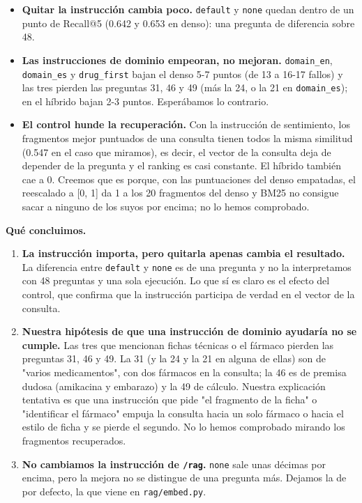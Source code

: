 \begin{itemize}
\tightlist
\item
  \textbf{Quitar la instrucción cambia poco.} \texttt{default} y \texttt{none} quedan dentro de un punto de Recall@5
  (0.642 y 0.653 en denso): una pregunta de diferencia sobre 48.
\item
  \textbf{Las instrucciones de dominio empeoran, no mejoran.} \texttt{domain\_\allowbreak{}en}, \texttt{domain\_\allowbreak{}es} y \texttt{drug\_\allowbreak{}first}
  bajan el denso 5-7 puntos (de 13 a 16-17 fallos) y las tres pierden las preguntas 31, 46 y 49
  (más la 24, o la 21 en \texttt{domain\_\allowbreak{}es}); en el híbrido bajan 2-3 puntos. Esperábamos lo contrario.
\item
  \textbf{El control hunde la recuperación.} Con la instrucción de sentimiento, los fragmentos mejor
  puntuados de una consulta tienen todos la misma similitud (0.547 en el caso que miramos), es
  decir, el vector de la consulta deja de depender de la pregunta y el ranking es casi constante.
  El híbrido también cae a 0. Creemos que es porque, con las puntuaciones del denso empatadas, el
  reescalado a {[}0, 1{]} da 1 a los 20 fragmentos del denso y BM25 no consigue sacar a ninguno de los
  suyos por encima; no lo hemos comprobado.
\end{itemize}

\textbf{Qué concluimos.}

\begin{enumerate}
\tightlist
\item
  \textbf{La instrucción importa, pero quitarla apenas cambia el resultado.} La diferencia entre
  \texttt{default} y \texttt{none} es de una pregunta y no la interpretamos con 48 preguntas y una sola
  ejecución. Lo que sí es claro es el efecto del control, que confirma que la instrucción
  participa de verdad en el vector de la consulta.
\item
  \textbf{Nuestra hipótesis de que una instrucción de dominio ayudaría no se cumple.} Las tres que
  mencionan fichas técnicas o el fármaco pierden las preguntas 31, 46 y 49. La 31 (y la 24 y la
  21 en alguna de ellas) son de "varios medicamentos", con dos fármacos en la consulta; la 46 es
  de premisa dudosa (amikacina y embarazo) y la 49 de cálculo. Nuestra explicación tentativa es que una instrucción que pide "el fragmento de
  la ficha" o "identificar el fármaco" empuja la consulta hacia un solo fármaco o hacia el estilo de
  ficha y se pierde el segundo. No lo hemos comprobado mirando los fragmentos recuperados.
\item
  \textbf{No cambiamos la instrucción de \texttt{/\allowbreak{}rag}.} \texttt{none} sale unas décimas por encima, pero la mejora
  no se distingue de una pregunta más. Dejamos la de por defecto, la que viene en \texttt{rag/\allowbreak{}embed.py}.
\end{enumerate}

